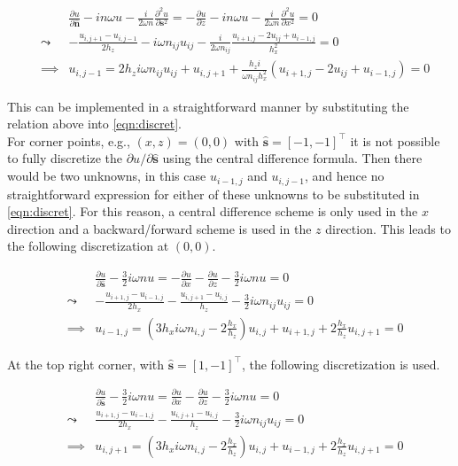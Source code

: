 \documentclass[10pt,a4paper]{article}
\newcommand{\n}{\mathbf{n}}
\newcommand{\s}{\mathbf{s}}
\begin{document}
\begin{eqnarray}
&&\frac{\partial u}{\partial \hat{\n}} - in\omega u - \frac{i}{2\omega n}\frac{\partial^2 u}{\partial \s^2}= -\frac{\partial u}{\partial z} - in\omega u - \frac{i}{2\omega n}\frac{\partial^2 u}{\partial x^2}=0\\
&\leadsto& -\frac{u_{i,j+1}-u_{i,j-1}}{2h_z} - i\omega n_{ij}u_{ij}-\frac{i}{2\omega n_{ij}}\frac{u_{i+1,j}-2u_{ij}+u_{i-1,j}}{h_x^2}=0\\
&\implies& u_{i,j-1} = 2h_z i\omega n_{ij}u_{ij}+u_{i,j+1}+\frac{h_z i}{\omega n_{ij}h_x^2}(u_{i+1,j}-2u_{ij}+u_{i-1,j})=0
\end{eqnarray}

This can be implemented in a straightforward manner by substituting the relation above into \cref{eqn:discret}.\\

For corner points, e.g., $(x,z)=(0,0)$ with $\hat{\s}=[-1,-1]^\top$ it is not possible to fully discretize the $\partial u/\partial\hat{\s}$ using the central difference formula. Then there would be two unknowns, in this case $u_{i-1,j}$ and $u_{i,j-1}$, and hence no straightforward expression for either of these unknowns to be substituted in \cref{eqn:discret}. For this reason, a central difference scheme is only used in the $x$ direction and a backward/forward scheme is used in the $z$ direction. This leads to the following discretization at $(0,0)$.

\begin{eqnarray}
&& \frac{\partial u}{\partial \hat{\s}}-\frac{3}{2}i\omega nu= -\frac{\partial u}{\partial x}-\frac{\partial u}{\partial z}-\frac{3}{2}i\omega nu=0\\
&\leadsto& -\frac{u_{i+1,j}-u_{i-1,j}}{2h_x}-\frac{u_{i,j+1}-u_{i,j}}{h_z}-\frac{3}{2}i\omega n_{ij}u_{ij}=0\\
&\implies& u_{i-1,j} = (3h_xi\omega n_{i,j}-2\frac{h_x}{h_z})u_{i,j}+u_{i+1,j}+2\frac{h_x}{h_z}u_{i,j+1}=0
\end{eqnarray}

At the top right corner, with $\hat{\s}=[1,-1]^\top$, the following discretization is used.

\begin{eqnarray}
&& \frac{\partial u}{\partial \hat{\s}}-\frac{3}{2}i\omega nu= \frac{\partial u}{\partial x}-\frac{\partial u}{\partial z}-\frac{3}{2}i\omega nu=0\\
&\leadsto& \frac{u_{i+1,j}-u_{i-1,j}}{2h_x}-\frac{u_{i,j+1}-u_{i,j}}{h_z}-\frac{3}{2}i\omega n_{ij}u_{ij}=0\\
&\implies& u_{i,j+1} = (3h_xi\omega n_{i,j}-2\frac{h_x}{h_z})u_{i,j}+u_{i-1,j}+2\frac{h_x}{h_z}u_{i,j+1}=0
\end{eqnarray}
\end{document}
